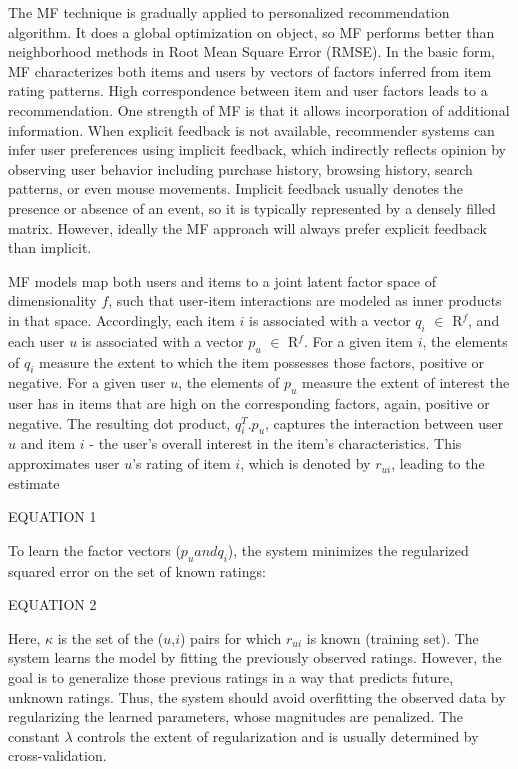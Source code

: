 \documentclass{article} %
\begin{document}
The MF technique is gradually applied to personalized recommendation algorithm. It does a global optimization on object, so MF performs better than neighborhood methods in Root Mean Square Error (RMSE). In the basic form, MF characterizes both items and users by vectors of factors inferred from item rating patterns. High correspondence between item and user factors leads to a recommendation. One strength of MF is that it allows incorporation of additional information. When explicit feedback is not available, recommender systems can infer user preferences using implicit feedback, which indirectly reflects opinion by observing user behavior including purchase history, browsing history, search patterns, or even mouse movements. Implicit feedback usually denotes the presence or absence of an event, so it is typically represented by a densely filled matrix. However, ideally the MF approach will always prefer explicit feedback than implicit.

MF models map both users and items to a joint latent factor space of dimensionality $f$, such that user-item interactions are modeled as inner products in that space. Accordingly, each item $i$ is associated with a vector $q_i$ $\in$ R$^f$, and each user $u$ is associated with a vector $p_u$ $\in$ R$^f$. For a given item $i$, the elements of $q_i$ measure the extent to which the item possesses those factors, positive or negative. For a given user $u$, the elements of $p_u$ measure the extent of interest the user has in items that are high on the corresponding factors, again, positive or negative. The resulting dot product, $q_i^T$$.$$p_u$, captures the interaction between user $u$ and item $i$ - the user's overall interest in the item's characteristics. This approximates user $u$'s rating of item $i$, which is denoted by $r_{ui}$, leading to the estimate

EQUATION 1

To learn the factor vectors ($p_u and q_i$), the system minimizes the regularized squared error on the set of known ratings:

EQUATION 2

Here, $\kappa$ is the set of the ($u$,$i$) pairs for which $r_{ui}$ is known (training set). The system learns the model by fitting the previously observed ratings. However, the goal is to generalize those previous ratings in a way that predicts future, unknown ratings. Thus, the system should avoid overfitting the observed data by regularizing the learned parameters, whose magnitudes are penalized. The constant $\lambda$ controls the extent of regularization and is usually determined by cross-validation.
\end{document}
